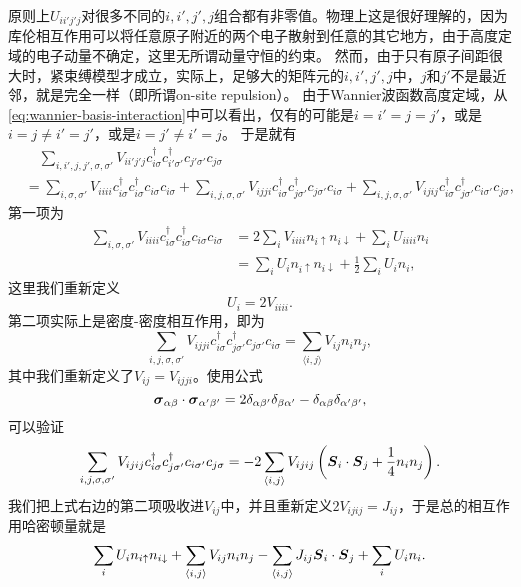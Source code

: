 \documentclass[hyperref, UTF8, a4paper]{ctexart}
\newcommand*{\pair}[1]{\langle #1 \rangle}
\begin{document}
原则上$U_{i i' j' j}$对很多不同的$i, i', j', j$组合都有非零值。物理上这是很好理解的，因为库伦相互作用可以将任意原子附近的两个电子散射到任意的其它地方，由于高度定域的电子动量不确定，这里无所谓动量守恒的约束。
然而，由于只有原子间距很大时，紧束缚模型才成立，实际上，足够大的矩阵元的$i, i', j', j$中，$j$和$j'$不是最近邻，就是完全一样（即所谓on-site repulsion）。
由于Wannier波函数高度定域，从\eqref{eq:wannier-basis-interaction}中可以看出，仅有的可能是$i=i'=j=j'$，或是$i=j \neq i'=j'$，或是$i=j' \neq i' = j$。
于是就有
\[
    \begin{aligned}
        &\quad \sum_{i, i', j, j', \sigma, \sigma'} V_{i i' j' j} c^\dagger_{i \sigma} c^\dagger_{i' \sigma'} c_{j' \sigma'} c_{j \sigma} \\
        &= \sum_{i, \sigma, \sigma'} V_{iiii} c^\dagger_{i \sigma} c^\dagger_{i \sigma} c_{i \sigma} c_{i \sigma} 
        + \sum_{i, j, \sigma, \sigma'} V_{i j j i} c^\dagger_{i \sigma} c^\dagger_{j \sigma'} c_{j \sigma'} c_{i \sigma}
        + \sum_{i, j, \sigma, \sigma'} V_{i j i j} c^\dagger_{i \sigma} c^\dagger_{j \sigma'} c_{i \sigma'} c_{j \sigma},
    \end{aligned}
\]
第一项为
\[
    \begin{aligned}
        \sum_{i, \sigma, \sigma'} V_{iiii} c^\dagger_{i \sigma} c^\dagger_{i \sigma} c_{i \sigma} c_{i \sigma} &= 2 \sum_{i} V_{iiii} n_{i \uparrow} n_{i \downarrow} + \sum_{i} U_{iiii} n_i \\
        &= \sum_{i} U_i n_{i \uparrow} n_{i \downarrow} + \frac{1}{2} \sum_{i} U_{i} n_i,
    \end{aligned}
\]
这里我们重新定义
\begin{equation}
    U_i = 2 V_{iiii}.
\end{equation}
第二项实际上是密度-密度相互作用，即为
\[
    \sum_{i, j, \sigma, \sigma'} V_{i j j i} c^\dagger_{i \sigma} c^\dagger_{j \sigma'} c_{j \sigma'} c_{i \sigma} = \sum_{\pair{i, j}} V_{ij} n_i n_j,
\]
其中我们重新定义了$V_{ij} = V_{ijji}$。使用公式
\[
    \vb*{\sigma}_{\alpha \beta} \cdot \vb*{\sigma}_{\alpha' \beta'} = 2 \delta_{\alpha \beta'} \delta_{\beta \alpha'} - \delta_{\alpha \beta} \delta_{\alpha' \beta'},
\]
可以验证
\[
    \sum_{i, j, \sigma, \sigma'} V_{i j i j} c^\dagger_{i \sigma} c^\dagger_{j \sigma'} c_{i \sigma'} c_{j \sigma} = - 2 \sum_{\pair{i, j}} V_{i j i j} \left( \vb*{S}_{i} \cdot \vb*{S}_j + \frac{1}{4} n_i n_j \right).
\]
我们把上式右边的第二项吸收进$V_{ij}$中，并且重新定义$2V_{ijij}=J_{ij}$，于是总的相互作用哈密顿量就是
\[
    \sum_{i} U_i n_{i \uparrow} n_{i \downarrow} + \sum_{\pair{i, j}} V_{ij} n_i n_j - \sum_{\pair{i, j}} J_{i j} \vb*{S}_{i} \cdot \vb*{S}_j + \sum_{i} U_i n_i.
\]
\end{document}
